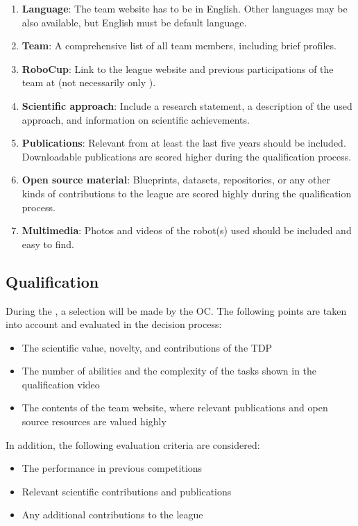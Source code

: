 \begin{enumerate}
	\item \textbf{Language}: The team website has to be in English. Other languages may be also available, but English must be default language.
	\item \textbf{Team}: A comprehensive list of all team members, including brief profiles.
	\item \textbf{RoboCup}: Link to the league website and previous participations of the team at \RoboCup{} (not necessarily only \AtHome).
	\item \textbf{Scientific approach}: Include a research statement, a description of the used approach, and information on scientific achievements.
	\item \textbf{Publications}: Relevant  from at least the last five years should be included. Downloadable publications are scored higher during the qualification process.
	\item \textbf{Open source material}: Blueprints, datasets, repositories, or any other kinds of contributions to the league are scored highly during the qualification process.
	\item \textbf{Multimedia}: Photos and videos of the robot(s) used should be included and easy to find.
\end{enumerate}

\subsection{Qualification}\label{rule:qualification}

During the , a selection will be made by the OC.
The following points are taken into account and evaluated in the decision process:
\begin{itemize}
	\item The scientific value, novelty, and contributions of the TDP
	\item The number of abilities and the complexity of the tasks shown in the qualification video
	\item The contents of the team website, where relevant publications and open source resources are valued highly
\end{itemize}
In addition, the following evaluation criteria are considered:
\begin{itemize}
	\item The performance in previous competitions
	\item Relevant scientific contributions and publications
	\item Any additional contributions to the \AtHome{} league
\end{itemize}

